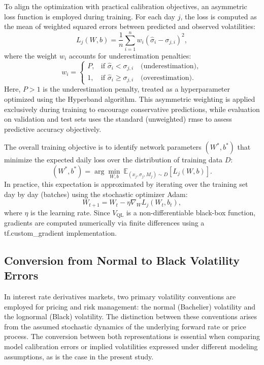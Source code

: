 To align the optimization with practical calibration objectives, an asymmetric loss function is employed during training. For each day $j$, the loss is computed as the mean of weighted squared errors between predicted and observed volatilities:
\begin{equation}
	L_j(W, b) = \frac{1}{n} \sum_{i=1}^{n} w_i (\hat{\sigma}_i - \sigma_{j,i})^2,
\end{equation}
where the weight $w_i$ accounts for underestimation penalties:
\begin{equation}
	w_i =
	\begin{cases}
		P, & \text{if } \hat{\sigma}_i < \sigma_{j,i} \quad \text{(underestimation)},   \\
		1, & \text{if } \hat{\sigma}_i \geq \sigma_{j,i} \quad \text{(overestimation)}.
	\end{cases}
\end{equation}
Here, $P>1$ is the underestimation penalty, treated as a hyperparameter optimized using the Hyperband algorithm. This asymmetric weighting is applied exclusively during training to encourage conservative predictions, while evaluation on validation and test sets uses the standard (unweighted) \ac{rmse} to assess predictive accuracy objectively.

The overall training objective is to identify network parameters $(W^*, b^*)$ that minimize the expected daily loss over the distribution of training data $D$:
\begin{equation}
	(W^*, b^*) = \arg \min_{W, b} \ \mathbb{E}_{(x_j, \sigma_j, M_j) \sim D} \left[ L_j(W, b) \right].
\end{equation}
In practice, this expectation is approximated by iterating over the training set day by day (batches) using the stochastic optimizer Adam:
\begin{equation}
	W_{t+1} = W_t - \eta \nabla_W L_j(W_t, b_t),
\end{equation}
where $\eta$ is the learning rate. Since $V_{\text{QL}}$ is a non-differentiable black-box function, gradients are computed numerically via finite differences using a tf.custom\_gradient implementation.

\subsection{Conversion from Normal to Black Volatility Errors}
\label{subsec:conversion_from_normal_to_lognormal_errors}
In interest rate derivatives markets, two primary volatility conventions are employed for pricing and risk management: the normal (Bachelier) volatility and the lognormal (Black) volatility. The distinction between these conventions arises from the assumed stochastic dynamics of the underlying forward rate or price process. The conversion between both representations is essential when comparing model calibration errors or implied volatilities expressed under different modeling assumptions, as is the case in the present study.

